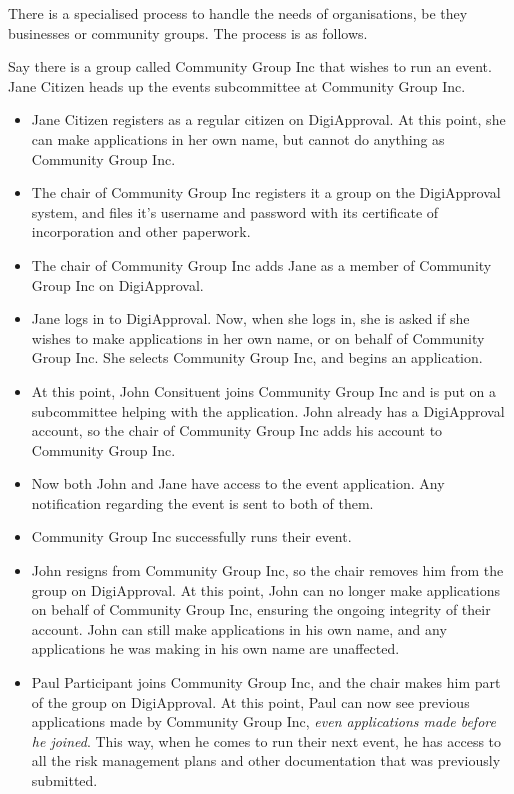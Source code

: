 \documentclass[12pt,a4paper,twosided]{article}
\begin{document}
There is a specialised process to handle the needs of organisations, be they businesses or community groups. The process is as follows.

Say there is a group called Community Group Inc that wishes to run an event. Jane Citizen heads up the events subcommittee at Community Group Inc.

\begin{itemize}
\item Jane Citizen registers as a regular citizen on DigiApproval. At this point, she can make applications in her own name, but cannot do anything as Community Group Inc.
\item The chair of Community Group Inc registers it a group on the DigiApproval system, and files it's username and password with its certificate of incorporation and other paperwork.
\item The chair of Community Group Inc adds Jane as a member of Community Group Inc on DigiApproval.
\item Jane logs in to DigiApproval. Now, when she logs in, she is asked if she wishes to make applications in her own name, or on behalf of Community Group Inc. She selects Community Group Inc, and begins an application.
\item At this point, John Consituent joins Community Group Inc and is put on a subcommittee helping with the application. John already has a DigiApproval account, so the chair of Community Group Inc adds his account to Community Group Inc.
\item Now both John and Jane have access to the event application. Any notification regarding the event is sent to both of them.
\item Community Group Inc successfully runs their event.
\item John resigns from Community Group Inc, so the chair removes him from the group on DigiApproval. At this point, John can no longer make applications on behalf of Community Group Inc, ensuring the ongoing integrity of their account. John can still make applications in his own name, and any applications he was making in his own name are unaffected.
\item Paul Participant joins Community Group Inc, and the chair makes him part of the group on DigiApproval. At this point, Paul can now see previous applications made by Community Group Inc, \emph{even applications made before he joined}. This way, when he comes to run their next event, he has access to all the risk management plans and other documentation that was previously submitted.
\end{itemize}
\end{document}
